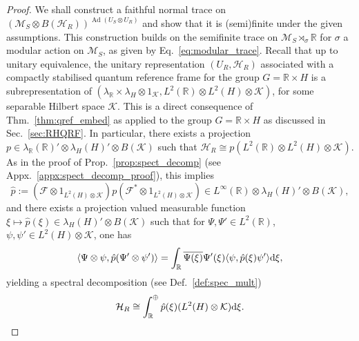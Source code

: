 \documentclass[sn-mathphys-num]{sn-jnl}%
\newcommand{\RR}{\mathbb{R}}
\newcommand{\HH}{\mathcal{H}}
\newcommand{\KK}{\mathcal{K}}
\newcommand{\MM}{\mathcal{M}}
\DeclareMathOperator{\Ad}{Ad}
\newcommand{\diff}{\textup{d}}
\numberwithin{equation}{section}
\theoremstyle{thmstyleone}%
\theoremstyle{thmstyletwo}%
\theoremstyle{thmstylethree}%
\begin{document}
\begin{proof}
    We shall construct a faithful normal trace on $\left(\MM_S\otimes B(\HH_R)\right)^{\Ad(U_S\otimes U_R)}$ and show that it is (semi)finite under the given assumptions. This construction builds on the semifinite trace on $\MM_S\rtimes_\sigma\RR$ for $\sigma$ a modular action on $\MM_S$, as given by Eq.\ \ref{eq:modular_trace}. Recall that up to unitary equivalence, the unitary representation $(U_R,\HH_R)$ associated with a compactly stabilised quantum reference frame for the group $G=\RR\times H$ is a subrepresentation of $(\lambda_\RR\times\lambda_H\otimes 1_\KK,L^2(\RR)\otimes L^2(H)\otimes \KK)$, for some separable Hilbert space $\KK$. This is a direct consequence of Thm.~\ref{thm:qref_embed} as applied to the group $G=\RR\times H$ as discussed in Sec.~\ref{sec:RHQRF}. In particular, there exists a projection $p\in \lambda_\RR(\RR)'\otimes\lambda_H(H)'\otimes B(\KK)$ such that $\HH_R\cong p(L^2(\RR)\otimes L^2(H)\otimes \KK)$. As in the proof of Prop.\ \ref{prop:spect_decomp} (see Appx.~\ref{appx:spect_decomp_proof}), this implies 
    \begin{equation}
        \hat{p}:=(\mathcal{F}\otimes 1_{L^2(H)\otimes \KK})p(\mathcal{F}^*\otimes 1_{L^2(H)\otimes \KK})\in L^\infty(\RR)\otimes\lambda_H(H)'\otimes B(\KK),
    \end{equation} and there exists a projection valued measurable function  $\xi\mapsto \hat{p}(\xi)\in \lambda_H(H)'\otimes B(\KK)$ such that for $\Psi,\Psi'\in L^2(\RR)$, $\psi,\psi'\in L^2(H)\otimes \KK$, one has
    \begin{equation}
        \langle \Psi\otimes \psi,\hat{p}(\Psi'\otimes\psi')\rangle=\int_\RR\overline{\Psi(\xi)}\Psi'(\xi)\langle \psi,\hat{p}(\xi)\psi'\rangle\diff\xi,
    \end{equation} yielding a spectral decomposition (see Def.\ \ref{def:spec_mult})
    \begin{equation}
        \HH_R\cong \int_\RR^\oplus \hat{p}(\xi)(L^2(H)\otimes \KK)\diff\xi.
    \end{equation}


\end{proof}
\end{document}

